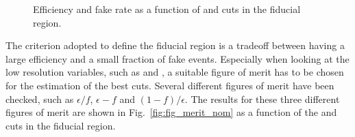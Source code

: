\begin{figure}[htb]
\centering
{}
\caption{Efficiency and fake rate as a function of \MET and \mt cuts in the fiducial region.}\label{fig:eff_fake_nom}
\end{figure}

The criterion adopted to define the fiducial region is a tradeoff between having a large efficiency and a small fraction of fake events. Especially when looking at the low resolution variables, such as \MET and \mt, a suitable figure of merit has to be chosen for the estimation of the best cuts.  Several different figures of merit have been checked, such as $\epsilon/f$, $\epsilon - f$ and $(1-f)/\epsilon$. The results for these three different figures of merit are shown in Fig.~\ref{fig:fig_merit_nom} as a function of the \MET and \mt cuts in the fiducial region.

